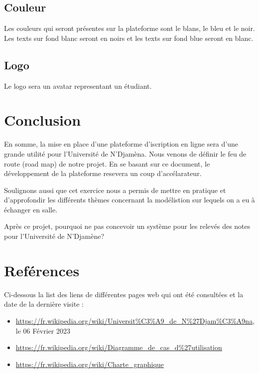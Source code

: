 \documentclass[12pt,a4paper]{article}
\begin{document}
	\subsection{Couleur}
	Les couleurs qui seront présentes sur la plateforme sont le blans, le bleu et le noir. Les texts sur fond blanc seront en noirs et les texts sur fond blue seront en blanc.
	
	\subsection{Logo}
	Le logo sera un avatar representant un étudiant.
	
	
	

	\newpage
	\section*{Conclusion}
	En somme, la mise en place d'une plateforme d'iscription en ligne sera d'une grande utilité pour l'Université de N'Djamèna. Nous venons de définir le feu de route (road map) de notre projet. En se basant sur ce document, le développement de la plateforme resevera un coup d'accélarateur. 
	
	Soulignons aussi que cet exercice nous a permis de mettre en pratique et d'approfondir les différents thèmes concernant la modélistion sur lequels on a eu à échanger en salle. 
	
	Après ce projet, pourquoi ne pas concevoir un système pour les relevés des notes pour l'Université de N'Djamène?
	
	\newpage
	\listoffigures
	\listoftables
	
	\newpage
	\section*{Reférences}
	Ci-dessous la list des liens de différentes pages web qui ont été consultées et la date de la dernière visite :
	\begin{itemize}
		\item \href{https://fr.wikipedia.org/wiki/Universit\%C3\%A9\_de\_N\%27Djam\%C3\%A9na}{https://fr.wikipedia.org/wiki/Universit\%C3\%A9\_de\_N\%27Djam\%C3\%A9na}, le 06 Février 2023
		\item \href{https://fr.wikipedia.org/wiki/Diagramme_de_cas_d\%27utilisation}{https://fr.wikipedia.org/wiki/Diagramme\_de\_cas\_d\%27utilisation}
		\item \href{https://fr.wikipedia.org/wiki/Charte_graphique}{https://fr.wikipedia.org/wiki/Charte\_graphique}
	\end{itemize}	
\end{document}
